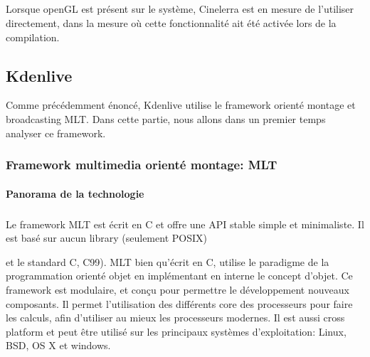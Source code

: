 \subparagraph{}

Lorsque openGL est présent sur le système, Cinelerra
est en mesure de l'utiliser directement, dans la mesure où cette
fonctionnalité ait été activée lors de la compilation. %





\subsection {Kdenlive}

Comme précédemment énoncé, Kdenlive utilise le framework orienté
montage et broadcasting MLT. Dans cette partie, nous allons dans un
premier temps analyser ce framework.

\subsubsection {Framework multimedia orienté montage: MLT}

\paragraph {Panorama de la technologie} %

\subparagraph{}

Le framework MLT est écrit en C et offre une API stable
simple et minimaliste. Il est basé sur aucun library (seulement POSIX)

 et le standard C, C99). MLT bien
qu'écrit en C, utilise le paradigme de la programmation orienté objet en
implémentant en interne le concept d'objet. Ce framework est modulaire,
et conçu pour permettre le développement nouveaux composants. Il
permet l'utilisation des différents core des processeurs pour faire
les calculs, afin d'utiliser au mieux les processeurs modernes. Il est
aussi cross platform et peut être utilisé sur les principaux systèmes
d'exploitation: Linux, BSD, OS X et windows.

